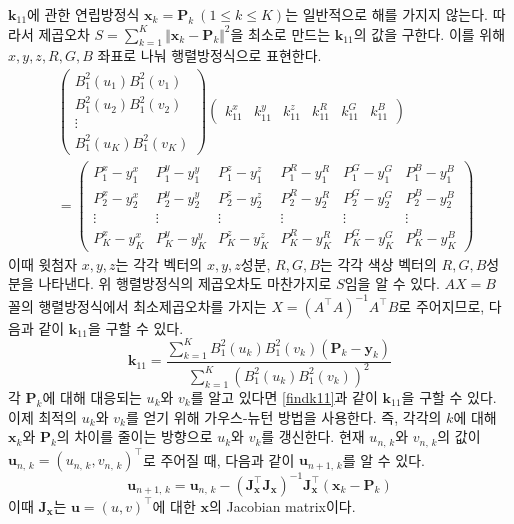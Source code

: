 \documentclass{gshs_thesis}
\theoremstyle{theorem}
\theoremstyle{lemma}
\theoremstyle{definition}
\begin{document}
$\mathbf{k}_{11}$에 관한 연립방정식 $\mathbf{x}_k = \mathbf{P}_k \ (1 \leq k \leq K)$는 일반적으로 해를 가지지 않는다. 따라서 제곱오차 $S = \sum_{k=1}^K \Vert \mathbf{x}_k - \mathbf{P}_k \Vert^2$을 최소로 만드는 $\mathbf{k}_{11}$의 값을 구한다. 이를 위해 $x, y, z, R, G, B$ 좌표로 나눠 행렬방정식으로 표현한다. 
\begin{align*}
	&\begin{pmatrix}
		B_1^2(u_1)B_1^2(v_1) \\ B_1^2(u_2)B_1^2(v_2) \\ \vdots \\ B_1^2(u_K)B_1^2(v_K)
	\end{pmatrix} \begin{pmatrix}
		k_{11}^x & k_{11}^y & k_{11}^z & k_{11}^R & k_{11}^G & k_{11}^B
	\end{pmatrix} \\
	&= \begin{pmatrix}
		P_1^x-y_1^x & P_1^y-y_1^y & P_1^z-y_1^z & P_1^R-y_1^R & P_1^G-y_1^G & P_1^B-y_1^B \\ P_2^x-y_2^x & P_2^y-y_2^y & P_2^z-y_2^z & P_2^R-y_2^R & P_2^G-y_2^G & P_2^B-y_2^B \\ \vdots & \vdots & \vdots & \vdots & \vdots & \vdots\\ 
		P_K^x-y_K^x & P_K^y-y_K^y & P_K^z-y_K^z & P_K^R-y_K^R & P_K^G-y_K^G & P_K^B-y_K^B
		\end{pmatrix}
\end{align*}
이때 윗첨자 $x, y, z$는 각각 벡터의 $x, y, z$성분, $R, G, B$는 각각 색상 벡터의 $R, G, B$성분을 나타낸다. 위 행렬방정식의 제곱오차도 마찬가지로 $S$임을 알 수 있다. $AX = B$ 꼴의 행렬방정식에서 최소제곱오차를 가지는 $X = (A^\intercal A)^{-1} A^\intercal B$로 주어지므로, 다음과 같이 $\mathbf{k}_{11}$을 구할 수 있다. 
\begin{equation} \label{findk11}
	\mathbf{k}_{11} = \frac{\sum_{k=1}^K B_1^2(u_k) B_1^2 (v_k) (\mathbf{P}_k - \mathbf{y}_k)}{\sum_{k=1}^K (B_1^2(u_k) B_1^2(v_k))^2}
\end{equation}
각 $\mathbf{P}_k$에 대해 대응되는 $u_k$와 $v_k$를 알고 있다면 \eqref{findk11}과 같이 $\mathbf{k}_{11}$을 구할 수 있다. 이제 최적의 $u_k$와 $v_k$를 얻기 위해 가우스-뉴턴 방법을 사용한다. 즉, 각각의 $k$에 대해 $\mathbf{x}_k$와 $\mathbf{P}_k$의 차이를 줄이는 방향으로 $u_k$와 $v_k$를 갱신한다. 현재 $u_{n, \, k}$와 $v_{n, \, k}$의 값이 $\mathbf{u}_{n, \, k} = (u_{n, \, k}, v_{n, \, k})^\intercal$로 주어질 때, 다음과 같이 $\mathbf{u}_{n+1, \, k}$를 알 수 있다. 
\begin{equation} 
	\mathbf{u}_{n+1, \, k} = \mathbf{u}_{n, \, k} - (\mathbf{J}_\mathbf{x}^\intercal \mathbf{J}_\mathbf{x})^{-1} \mathbf{J}_\mathbf{x}^\intercal (\mathbf{x}_k - \mathbf{P}_k)
\end{equation}
이때 $\mathbf{J}_\mathbf{x}$는 $\mathbf{u} = (u, v)^\intercal$에 대한 $\mathbf{x}$의 Jacobian matrix이다.
\end{document}
